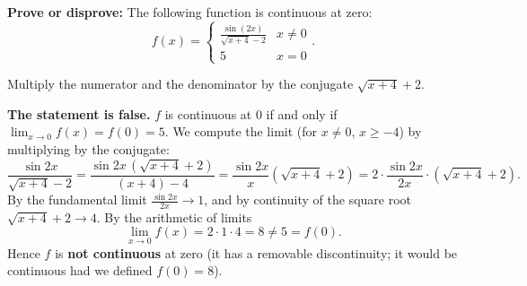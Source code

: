 
\begin{question}
\textbf{Prove or disprove:} The following function is continuous at zero:
\[ f(x)=\begin{cases} \frac{\sin(2x)}{\sqrt{x+4}-2} & x\neq 0\\ 5 & x=0\end{cases}. \]
\end{question}

\begin{hint}
Multiply the numerator and the denominator by the conjugate $\sqrt{x+4}+2$.
\end{hint}

\begin{solution}
\textbf{The statement is false.} $f$ is continuous at $0$ if and only if $\lim_{x\to0}f(x)=f(0)=5$. We compute the limit (for $x\ne0$, $x\ge-4$) by multiplying by the conjugate:
\[ \frac{\sin 2x}{\sqrt{x+4}-2}=\frac{\sin 2x\,(\sqrt{x+4}+2)}{(x+4)-4}=\frac{\sin2x}{x}\left(\sqrt{x+4}+2\right)=2\cdot\frac{\sin 2x}{2x}\cdot\left(\sqrt{x+4}+2\right). \]
By the fundamental limit $\frac{\sin2x}{2x}\to1$, and by continuity of the square root $\sqrt{x+4}+2\to4$. By the arithmetic of limits
\[ \lim_{x\to0}f(x)=2\cdot1\cdot4=8\neq5=f(0). \]
Hence $f$ is \textbf{not continuous} at zero (it has a removable discontinuity; it would be continuous had we defined $f(0)=8$).
\end{solution}
